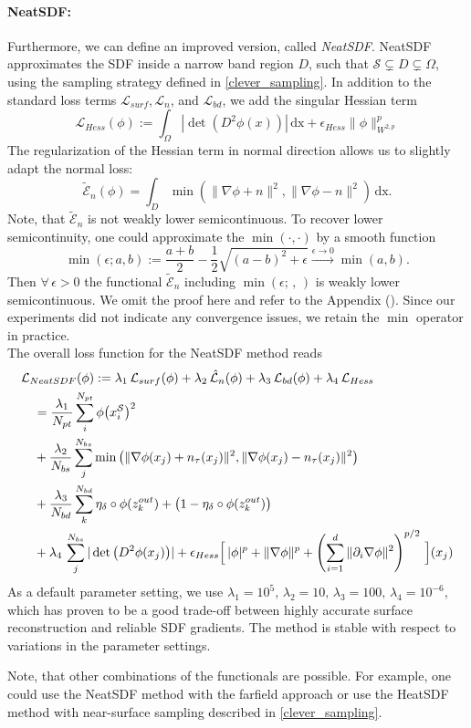 \documentclass[draft,12pt,openany]{book}
\def\S{\mathcal{S}}
\theoremstyle{plainnormal}
\theoremstyle{remark}
\begin{document}
\paragraph{NeatSDF:} Furthermore, we can define an improved version, called \emph{NeatSDF}. NeatSDF approximates the SDF inside a narrow band region $D$, such that $\S\subsetneq D\subsetneq\Omega$, using the sampling strategy defined in \cref{clever_sampling}. In addition to the standard loss terms $\mathcal{L}_{surf}, \mathcal L_{n}$, and $\mathcal{L}_{bd}$, we add the singular Hessian term 
$$ \mathcal L_{Hess}(\phi) := \int_\Omega |\det(D^2 \phi(x))| \,\mathrm{dx} + \epsilon_{Hess} \|\phi \|_{W^{2,p}}^p $$ The regularization of the Hessian term in normal direction allows us to slightly adapt the normal loss:
$$\tilde{\mathcal{E}}_{n}(\phi)= \int_D \min(\|\nabla \phi + n\|^2,\|\nabla \phi - n\|^2) \,\mathrm{dx}.$$
Note, that $\tilde{\mathcal{E}}_n$ is not weakly lower semicontinuous. To recover lower semicontinuity, one could approximate the $\min(\cdot,\cdot)$ by a smooth function $$\min(\epsilon;a,b) := \frac{a + b}{2} - \frac{1}{2}\sqrt{(a-b)^2 + \epsilon} \xrightarrow[]{\epsilon \rightarrow0} \min(a,b).$$ Then $\forall\,\epsilon> 0$ the functional $\tilde {\mathcal E}_n$ including $\min(\epsilon; \,,\,)$ is weakly lower semicontinuous. We omit the proof here and refer to the Appendix (). Since our experiments did not indicate any convergence issues, we retain the $\min$ operator in practice.\\ 
The overall loss function for the NeatSDF method reads \begin{align}
    &\mathcal{L}_{NeatSDF}(\phi) := \lambda_1\, \mathcal{L}_{surf}(\phi) + \lambda _2\,\hat{\mathcal{L}}_{n}(\phi) + \lambda_3\,\mathcal{L}_{bd}(\phi) + \lambda_4\, \mathcal{L}_{Hess}\notag\\
    &\quad =\frac{\lambda_1}{N_{pt}}\sum_i^{N_{pt}}\phi\big( x_i^\S\big)^2
     \notag\\\notag & \quad + \frac{\lambda_2}{N_{bs}}\sum_j^{N_{bs}}
\min\big( \|\nabla \phi(x_j) + n_\tau(x_j)\|^2, \|\nabla \phi(x_j) - n_\tau(x_j)\|^2\big) \notag\\ & \quad+ \frac{\lambda_3}{N_{bd}} \sum_k^{N_{bd}} \eta_\delta\circ\phi(z_k^{out}) +\big(1-\eta_\delta\circ\phi(z_k^{out})\big)\notag\\
&\quad +\lambda_4\, \sum_j^{N_{bs}}|\det\big( D^2 \phi(x_j)\big)| + \epsilon_{Hess}\Big[\,|\phi|^p + \|\nabla \phi\|^p + \left( \sum_{i=1}^d \| \partial_i \nabla \phi \|^2 \right)^{p/2} \,\Big](x_j) 
\end{align} 
As a default parameter setting, we use $\lambda_ 1 = 10^5, \,\lambda_2 = 10, \,\lambda_3 = 100, \,\lambda_4 = 10^{-6}$, which has proven to be a good trade-off between highly accurate surface reconstruction and reliable SDF gradients. The method is stable with respect to variations in the parameter settings.\par
Note, that other combinations of the functionals are possible. For example, one could use the NeatSDF method with the farfield approach or use the HeatSDF method with near-surface sampling described in \cref{clever_sampling}. 
\end{document}

